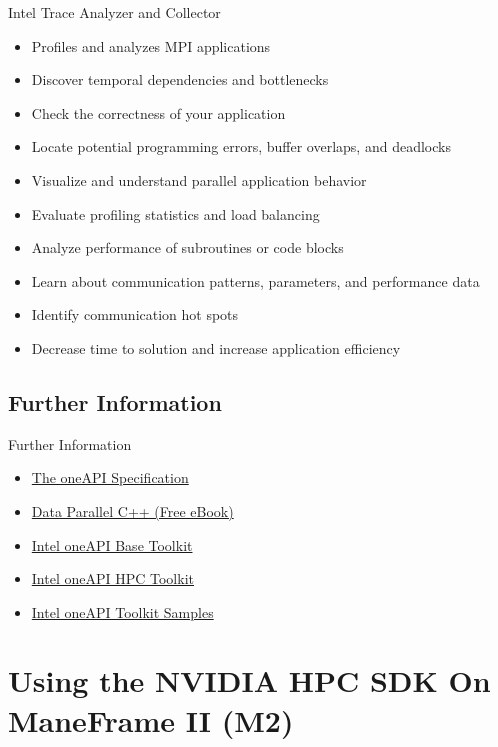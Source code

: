 \documentclass[aspectratio=169]{beamer}
\begin{document}
\begin{frame}{Intel Trace Analyzer and Collector}
\begin{itemize}
  \item Profiles and analyzes MPI applications
  \item Discover temporal dependencies and bottlenecks
  \item Check the correctness of your application
  \item Locate potential programming errors, buffer overlaps, and deadlocks
  \item Visualize and understand parallel application behavior
  \item Evaluate profiling statistics and load balancing
  \item Analyze performance of subroutines or code blocks
  \item Learn about communication patterns, parameters, and performance data
  \item Identify communication hot spots
  \item Decrease time to solution and increase application efficiency
\end{itemize}
\end{frame}

\subsection{Further Information}

\begin{frame}{Further Information}
\begin{itemize}
  \item \href{https://www.oneapi.com}{The oneAPI Specification}
  \item \href{https://www.apress.com/gp/book/9781484255735}{Data Parallel C++ (Free eBook)}
  \item \href{https://software.intel.com/content/www/us/en/develop/tools/oneapi/base-toolkit.html}{Intel oneAPI Base Toolkit}
  \item \href{https://software.intel.com/content/www/us/en/develop/tools/oneapi/hpc-toolkit.html}{Intel oneAPI HPC Toolkit}
  \item \href{https://github.com/oneapi-src/oneAPI-samples}{Intel oneAPI Toolkit Samples}
\end{itemize}
\end{frame}

\section{Using the NVIDIA HPC SDK On ManeFrame II (M2)}
\end{document}
